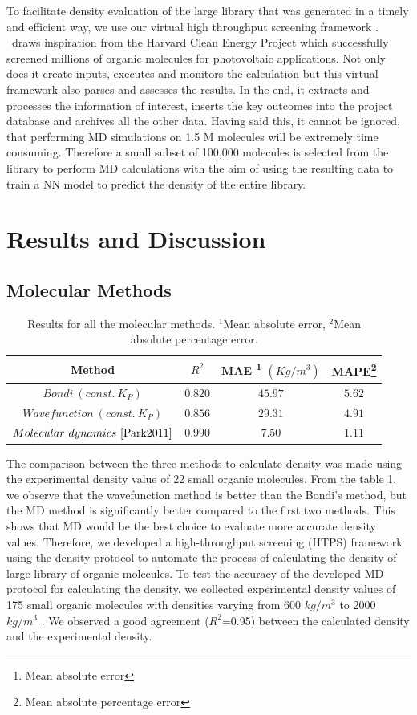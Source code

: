 To facilitate density evaluation of the large library that was generated in a timely and efficient way, we use our virtual high throughput screening framework \chemhtps. \chemhtps\ draws inspiration from the Harvard Clean Energy Project which successfully screened millions of organic molecules for photovoltaic applications. Not only does it create inputs, executes and monitors the calculation but this virtual framework also parses and assesses the results. In the end, it extracts and processes the information of interest, inserts the key outcomes into the project database and archives all the other data. Having said this, it cannot be ignored, that performing MD simulations on 1.5 M molecules will be extremely time consuming. Therefore a small subset of 100,000 molecules is selected from the library to perform MD calculations with the aim of using the resulting data to train a NN model to predict the density of the entire library.

\section{Results and Discussion}
\label{sec:results_discussion6}

\subsection{Molecular Methods}
\label{subsec:MD methods}
\begin{table}[htbp]
	\centering
	\begin{tabular}{ |c|c|c|c|  }
		\hline
		Method& $R^2$ &MAE \footnote{Mean absolute error} $(Kg/m^3)$&MAPE\footnote{Mean absolute percentage error}\\
		\hline
		$Bondi\ (const.\ K_P)$  &$0.820$    &$45.97$&  $5.62$\\
		$Wavefunction\ (const.\ K_P)$&$0.856$ &  $29.31$ & $4.91$\\
		$Molecular\ dynamics\ \text{\cite{Park2011}} $& $0.990$ &$7.50$& $1.11$\\
		\hline
		
	\end{tabular}
	\caption{Results for all the molecular methods. $^1$Mean absolute error, $^2$Mean absolute percentage error. }
	\label{table: 1}
\end{table}


The comparison between the three methods to calculate density was made using the experimental density value of 22 small organic molecules. From the table 1, we observe that the wavefunction method is better than the Bondi’s method, but the MD method is significantly better compared to the first two methods. This shows that MD would be the best choice to evaluate more accurate density values. Therefore, we developed a high-throughput screening (HTPS) framework using the density protocol to automate the process of calculating the density of large library of organic molecules. To test the accuracy of the developed MD protocol for calculating the density, we collected experimental density values of 175 small organic molecules with densities varying from 600 $kg/m^3$ to 2000 $kg/m^3$ \cite{Piacenza1996}. We observed a good agreement ($R^2$=0.95) between the calculated density and the experimental density. 

